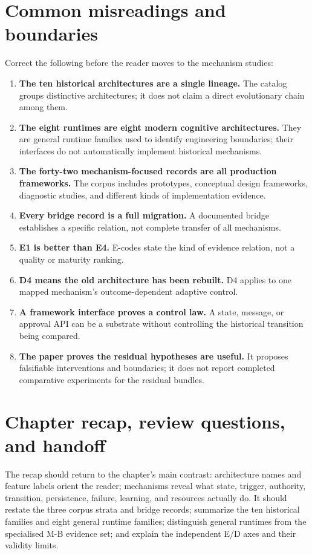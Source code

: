 \section{Common misreadings and boundaries}
Correct the following before the reader moves to the mechanism studies:
\begin{enumerate}
  \item \textbf{The ten historical architectures are a single lineage.} The catalog groups distinctive architectures; it does not claim a direct evolutionary chain among them.
  \item \textbf{The eight runtimes are eight modern cognitive architectures.} They are general runtime families used to identify engineering boundaries; their interfaces do not automatically implement historical mechanisms.
  \item \textbf{The forty-two mechanism-focused records are all production frameworks.} The corpus includes prototypes, conceptual design frameworks, diagnostic studies, and different kinds of implementation evidence.
  \item \textbf{Every bridge record is a full migration.} A documented bridge establishes a specific relation, not complete transfer of all mechanisms.
  \item \textbf{E1 is better than E4.} E-codes state the kind of evidence relation, not a quality or maturity ranking.
  \item \textbf{D4 means the old architecture has been rebuilt.} D4 applies to one mapped mechanism's outcome-dependent adaptive control.
  \item \textbf{A framework interface proves a control law.} A state, message, or approval API can be a substrate without controlling the historical transition being compared.
  \item \textbf{The paper proves the residual hypotheses are useful.} It proposes falsifiable interventions and boundaries; it does not report completed comparative experiments for the residual bundles.
\end{enumerate}

\section{Chapter recap, review questions, and handoff}
The recap should return to the chapter's main contrast: architecture names and feature labels orient the reader; mechanisms reveal what state, trigger, authority, transition, persistence, failure, learning, and resources actually do. It should restate the three corpus strata and bridge records; summarize the ten historical families and eight general runtime families; distinguish general runtimes from the specialised M-B evidence set; and explain the independent E/D axes and their validity limits.

